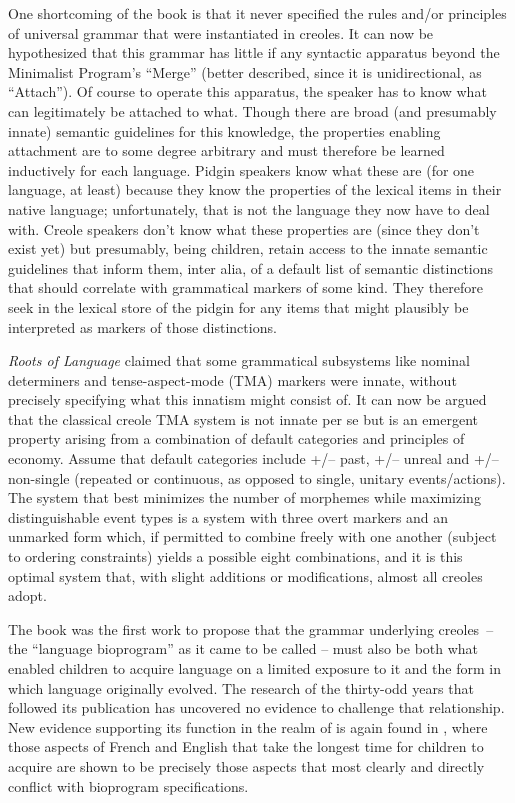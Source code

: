 One shortcoming of the book is that it never specified the rules and/or principles of universal grammar that were instantiated in creoles. It can now be hypothesized that this grammar has little if any syntactic apparatus beyond the Minimalist Program’s “Merge” (better described, since it is unidirectional, as “Attach”). Of course to operate this apparatus, the speaker has to know what can legitimately be attached to what. Though there are broad (and presumably innate) semantic guidelines for this knowledge, the properties enabling attachment are to some degree arbitrary and must therefore be learned inductively for each language. Pidgin speakers know what these are (for one language, at least) because they know the properties of the lexical items in their native language; unfortunately, that is not the language they now have to deal with. Creole speakers don’t know what these properties are (since they don’t exist yet) but presumably, being children, retain access to the innate semantic guidelines that inform them, inter alia, of a default list of semantic distinctions that should correlate with grammatical markers of some kind. They therefore seek in the lexical store of the pidgin for any items that might plausibly be interpreted as markers of those distinctions.

\textit{Roots of Language} claimed that some grammatical subsystems like nominal determiners and tense-aspect-mode (TMA) markers were innate, without precisely specifying what this innatism might consist of. It can now be argued that the classical creole TMA system is not innate per se but is an emergent property arising from a combination of default categories and principles of economy. Assume that default categories include +/– past, +/– unreal and +/– non-single (repeated or continuous, as opposed to single, unitary events/actions). The system that best minimizes the number of morphemes while maximizing distinguishable event types is a system with three overt markers and an unmarked form which, if permitted to combine freely with one another (subject to ordering constraints) yields a possible eight combinations, and it is this optimal system that, with slight additions or modifications, almost all creoles adopt.

The book was the first work to propose that the grammar underlying creoles~-- the “language bioprogram” as it came to be called -- must also be both what enabled children to acquire language on a limited exposure to it and the form in which language originally evolved. The research of the thirty-odd years that followed its publication has uncovered no evidence to challenge that relationship. New evidence supporting its function in the realm of is again found in \citet[Chapter 7]{Bickerton2014}, where those aspects of French and English that take the longest time for children to acquire are shown to be precisely those aspects that most clearly and directly conflict with bioprogram specifications.

